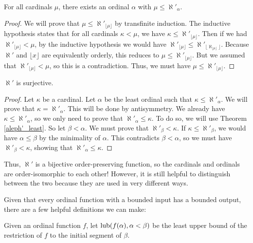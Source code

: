 \documentclass[../../math.tex]{subfiles}
\begin{document}
\begin{lemma}
    For all cardinals $\mu$, there exists an ordinal $\alpha$ with $\mu \leq
    \aleph'_\alpha$.
\end{lemma}
\begin{proof}
    We will prove that $\mu \leq \aleph'_{\lfloor \mu \rfloor}$ by transfinite
    induction.  The inductive hypothesis states that for all cardinals $\kappa <
    \mu$, we have $\kappa \leq \aleph'_{\lfloor \mu \rfloor}$.  Then if we had
    $\aleph'_{\lfloor \mu \rfloor} < \mu$, by the inductive hypothesis we would
    have $\aleph'_{\lfloor \mu \rfloor} \leq \aleph'_{\lfloor \aleph_{\lfloor
    \mu \rfloor} \rfloor}$.  Because $\aleph'$ and $\lfloor x \rfloor$ are
    equivalently orderly, this reduces to $\mu \leq \aleph'_{\lfloor \mu
    \rfloor}$.  But we assumed that $\aleph'_{\lfloor \mu \rfloor} < \mu$, so
    this is a contradiction.  Thus, we must have $\mu \leq \aleph'_{\lfloor \mu
    \rfloor}$.
\end{proof}

\begin{instance}
    $\aleph'$ is surjective.
\end{instance}
\begin{proof}
    Let $\kappa$ be a cardinal.  Let $\alpha$ be the least ordinal such that
    $\kappa \leq \aleph'_\alpha$.  We will prove that $\kappa =
    \aleph'_\alpha$.  This will be done by antisymmetry.  We already have
    $\kappa \leq \aleph'_\alpha$, so we only need to prove that $\aleph'_\alpha
    \leq \kappa$.  To do so, we will use Theorem \ref{aleph'_least}.  So let
    $\beta < \alpha$.  We must prove that $\aleph'_\beta < \kappa$.  If $\kappa
    \leq \aleph'_\beta$, we would have $\alpha \leq \beta$ by the minimality of
    $\alpha$.  This contradicts $\beta < \alpha$, so we must have $\aleph'_\beta
    < \kappa$, showing that $\aleph'_\alpha \leq \kappa$.
\end{proof}

Thus, $\aleph'$ is a bijective order-preserving function, so the cardinals and
ordinals are order-isomorphic to each other!  However, it is still helpful to
distinguish between the two because they are used in very different ways.

Given that every ordinal function with a bounded input has a bounded output,
there are a few helpful definitions we can make:

\begin{definition}
    Given an ordinal function $f$, let $\operatorname{lub}(f(\alpha), \alpha < \beta)$ be the
    least upper bound of the restriction of $f$ to the initial segment of
    $\beta$.
\end{definition}
\end{document}
